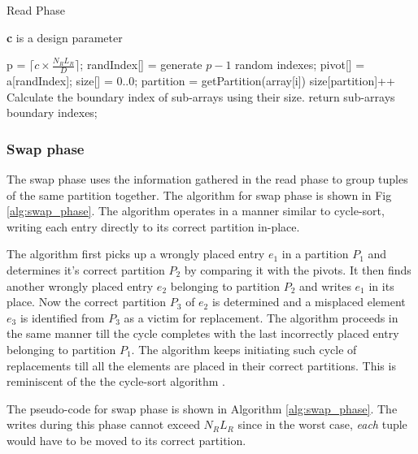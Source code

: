 \begin{algorithm}
\caption{Read Phase}
\label{alg:read_phase}
\textbf{c} is a design parameter\\
\begin{algorithmic}[1]
\State p = $\lceil c\times \frac{N_R L_R}{D} \rceil$;
\State randIndex[] = generate $p-1$ random indexes;
\State pivot[] = a[randIndex];
\State size[] = {0..0};   
\State partition = getPartition(array[i]) 
\State size[partition]++ 
\EndFor
{}
\State Calculate the boundary index of sub-arrays using their size.
\State return sub-arrays boundary indexes;
\end{algorithmic}
\end{algorithm}


\subsubsection{Swap phase} 
The swap phase uses the information gathered in the read phase to group tuples of the same partition together. The algorithm for swap phase is shown in Fig \ref{alg:swap_phase}. The algorithm operates in a manner similar to cycle-sort, writing each entry directly to its correct partition in-place. 

The algorithm first picks up a wrongly placed entry $e_1$ in a partition $P_1$ and determines it's correct partition $P_2$ by comparing it with the pivots. It then finds another wrongly placed entry $e_2$ belonging to partition $P_2$ and writes $e_1$ in its place. Now the correct partition $P_3$ of $e_2$ is determined and a misplaced element $e_3$ is identified from $P_3$ as a victim for replacement. The algorithm proceeds in the same manner till the cycle completes with the last incorrectly placed entry belonging to partition $P_1$. The algorithm keeps initiating such cycle of replacements till all the elements are placed in their correct partitions. This is reminiscent of the the cycle-sort algorithm \cite{cycle_sort}.

The pseudo-code for swap phase is shown in Algorithm \ref{alg:swap_phase}. The writes during this phase cannot exceed $N_R L_R$ since in the worst case, \emph{each} tuple would have to be moved to its correct partition.

